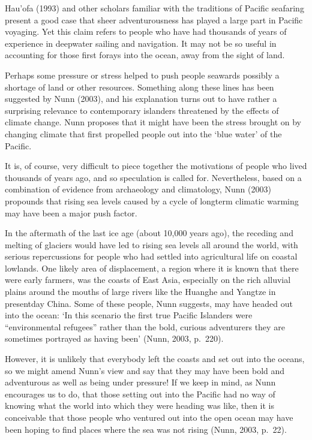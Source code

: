 \documentclass[letterpaper,10pt,english]{sphinxmanual}
\begin{document}
Hau’ofa (1993) and other scholars familiar with the traditions of Pacific seafaring present a good case that sheer adventurousness has played a large part in Pacific voyaging. Yet this claim refers to people who have had thousands of years of experience in deep\sphinxhyphen{}water sailing and navigation. It may not be so useful in accounting for those first forays into the ocean, away from the sight of land.

Perhaps some pressure or stress helped to push people seawards \textendash{} possibly a shortage of land or other resources. Something along these lines has been suggested by Nunn (2003), and his explanation turns out to have rather a surprising relevance to contemporary islanders threatened by the effects of climate change. Nunn proposes that it might have been the stress brought on by changing climate that first propelled people out into the ‘blue water’ of the Pacific.

It is, of course, very difficult to piece together the motivations of people who lived thousands of years ago, and so speculation is called for. Nevertheless, based on a combination of evidence from archaeology and climatology, Nunn (2003) propounds that rising sea levels caused by a cycle of long\sphinxhyphen{}term climatic warming may have been a major push factor.

In the aftermath of the last ice age (about 10,000 years ago), the receding and melting of glaciers would have led to rising sea levels all around the world, with serious repercussions for people who had settled into agricultural life on coastal lowlands. One likely area of displacement, a region where it is known that there were early farmers, was the coasts of East Asia, especially on the rich alluvial plains around the mouths of large rivers like the Huanghe and Yangtze in present\sphinxhyphen{}day China.
Some of these people, Nunn suggests, may have headed out into the ocean: ‘In this scenario the first true Pacific Islanders were “environmental refugees” rather than the bold, curious adventurers they are sometimes portrayed as having been’ (Nunn, 2003, p. 220).

However, it is unlikely that everybody left the coasts and set out into the oceans, so we might amend Nunn’s view and say that they may have been bold and adventurous as well as being under pressure! If we keep in mind, as Nunn encourages us to do, that those setting out into the Pacific had no way of knowing what the world into which they were heading was like, then it is conceivable that those people who ventured out into the open ocean may have been hoping to find places where the sea was not
rising (Nunn, 2003, p. 22).
\end{document}
